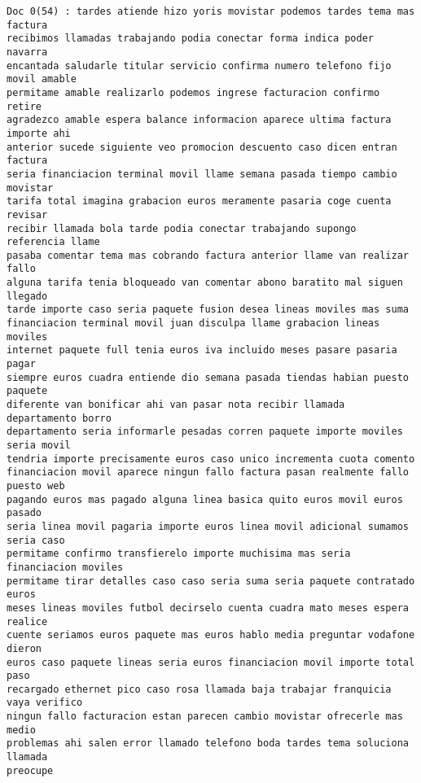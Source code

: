 \begin{Verbatim}[commandchars=\\\{\}]
Doc 0(54) : tardes atiende hizo yoris movistar podemos tardes tema mas factura
recibimos llamadas trabajando podia conectar forma indica poder navarra
encantada saludarle titular servicio confirma numero telefono fijo movil amable
permitame amable realizarlo podemos ingrese facturacion confirmo retire
agradezco amable espera balance informacion aparece ultima factura importe ahi
anterior sucede siguiente veo promocion descuento caso dicen entran factura
seria financiacion terminal movil llame semana pasada tiempo cambio movistar
tarifa total imagina grabacion euros meramente pasaria coge cuenta revisar
recibir llamada bola tarde podia conectar trabajando supongo referencia llame
pasaba comentar tema mas cobrando factura anterior llame van realizar fallo
alguna tarifa tenia bloqueado van comentar abono baratito mal siguen llegado
tarde importe caso seria paquete fusion desea lineas moviles mas suma
financiacion terminal movil juan disculpa llame grabacion lineas moviles
internet paquete full tenia euros iva incluido meses pasare pasaria pagar
siempre euros cuadra entiende dio semana pasada tiendas habian puesto paquete
diferente van bonificar ahi van pasar nota recibir llamada departamento borro
departamento seria informarle pesadas corren paquete importe moviles seria movil
tendria importe precisamente euros caso unico incrementa cuota comento
financiacion movil aparece ningun fallo factura pasan realmente fallo puesto web
pagando euros mas pagado alguna linea basica quito euros movil euros pasado
seria linea movil pagaria importe euros linea movil adicional sumamos seria caso
permitame confirmo transfierelo importe muchisima mas seria financiacion moviles
permitame tirar detalles caso caso seria suma seria paquete contratado euros
meses lineas moviles futbol decirselo cuenta cuadra mato meses espera realice
cuente seriamos euros paquete mas euros hablo media preguntar vodafone dieron
euros caso paquete lineas seria euros financiacion movil importe total paso
recargado ethernet pico caso rosa llamada baja trabajar franquicia vaya verifico
ningun fallo facturacion estan parecen cambio movistar ofrecerle mas medio
problemas ahi salen error llamado telefono boda tardes tema soluciona llamada
preocupe



\end{Verbatim}
